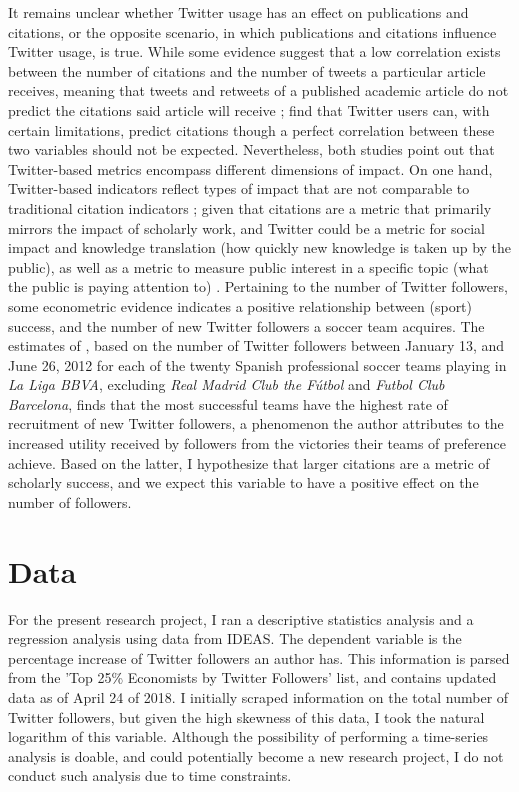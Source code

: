 \documentclass[12pt,english]{article}
\begin{document}
It remains unclear whether Twitter usage has an effect on publications and citations, or the opposite scenario, in which publications and citations influence Twitter usage, is true. While some evidence suggest that a low correlation exists between the number of citations and the number of tweets a particular article receives, meaning that tweets and retweets of a published academic article do not predict the citations said article will receive \citep{green}; \cite{blue} find that Twitter users can, with certain limitations, predict citations though a perfect correlation between these two variables should not be expected. Nevertheless, both studies point out that Twitter-based metrics encompass different dimensions of impact. On one hand, Twitter-based indicators reflect types of impact that are not comparable to traditional citation indicators \citep{green}; given that citations are a metric that primarily mirrors the impact of scholarly work, and Twitter could be a metric for social impact and knowledge translation (how quickly new knowledge is taken up by the public), as well as a metric to measure public interest in a specific topic (what the public is paying attention to) \citep{blue}. Pertaining to the number of Twitter followers, some econometric evidence indicates a positive relationship between (sport) success, and the number of new Twitter followers a soccer team acquires. The estimates of \cite{levi.soccer}, based on the number of Twitter followers between January 13, and June 26, 2012 for each of the twenty Spanish professional soccer teams playing in \textit{La Liga BBVA}, excluding \textit{Real Madrid Club the Fútbol} and \textit{Futbol Club Barcelona}, finds that the most successful teams have the highest rate of recruitment of new Twitter followers, a phenomenon the author attributes to the increased utility received by followers from the victories their teams of preference achieve. Based on the latter, I hypothesize that larger citations are a metric of scholarly success, and we expect this variable to have a positive effect on the number of followers. 

\section{Data}\label{sec:data}
For the present research project, I ran a descriptive statistics analysis and a regression analysis using data from IDEAS. The dependent variable is the percentage increase of Twitter followers an author has. This information is parsed from the 'Top 25\% Economists by Twitter Followers' list, and contains updated data as of April 24 of 2018. I initially scraped information on the total number of Twitter followers, but given the high skewness of this data, I took the natural logarithm of this variable. Although the possibility of performing a time-series analysis is doable, and could potentially become a new research project, I do not conduct such analysis due to time constraints. 
\end{document}
